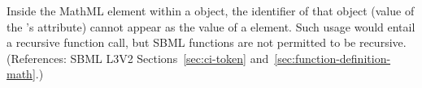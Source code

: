 Inside the  MathML element within a \FunctionDefinition
object, the identifier of that object (\ie value of the
\FunctionDefinition's  attribute) cannot appear as the value of a
 element.  Such usage would entail a recursive function call, but
SBML functions are not permitted to be recursive.  (References: SBML L3V2
Sections~\ref{sec:ci-token} and~\ref{sec:function-definition-math}.)
